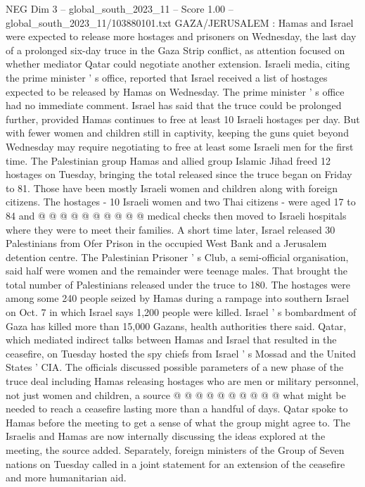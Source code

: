 \begin{textsample}{NEG Dim 3 – global\_south\_2023\_11 – Score 1.00 – global\_south\_2023\_11/103880101.txt}  \label{ex:f3_neg_089}
GAZA/JERUSALEM : Hamas and Israel were expected to release more hostages and prisoners on Wednesday, the last day of a prolonged six-day truce in the Gaza Strip conflict, as attention focused on whether mediator Qatar could negotiate another extension.
Israeli media, citing the prime minister ' s office, reported that Israel received a list of hostages expected to be released by Hamas on Wednesday.
The prime minister ' s office had no immediate comment.
Israel has said that the truce could be prolonged further, provided Hamas continues to free at least 10 Israeli hostages per day.
But with fewer women and children still in captivity, keeping the guns quiet beyond Wednesday may require negotiating to free at least some Israeli men for the first time.
The Palestinian group Hamas and allied group Islamic Jihad freed 12 hostages on Tuesday, bringing the total released since the truce began on Friday to 81.
Those have been mostly Israeli women and children along with foreign citizens.
The hostages - 10 Israeli women and two Thai citizens - were aged 17 to 84 and @ @ @ @ @ @ @ @ @ @ medical checks then moved to Israeli hospitals where they were to meet their families.
A short time later, Israel released 30 Palestinians from Ofer Prison in the occupied West Bank and a Jerusalem detention centre.
The Palestinian Prisoner ' s Club, a semi-official organisation, said half were women and the remainder were teenage males.
That brought the total number of Palestinians released under the truce to 180.
The hostages were among some 240 people seized by Hamas during a rampage into southern Israel on Oct. 7 in which Israel says 1,200 people were killed.
Israel ' s bombardment of Gaza has killed more than 15,000 Gazans, health authorities there said.
Qatar, which mediated indirect talks between Hamas and Israel that resulted in the ceasefire, on Tuesday hosted the spy chiefs from Israel ' s Mossad and the United States ' CIA.
The officials discussed possible parameters of a new phase of the truce deal including Hamas releasing hostages who are men or military personnel, not just women and children, a source @ @ @ @ @ @ @ @ @ @ what might be needed to reach a ceasefire lasting more than a handful of days.
Qatar spoke to Hamas before the meeting to get a sense of what the group might agree to.
The Israelis and Hamas are now internally discussing the ideas explored at the meeting, the source added.
Separately, foreign ministers of the Group of Seven nations on Tuesday called in a joint statement for an extension of the ceasefire and more humanitarian aid.

\end{textsample}
